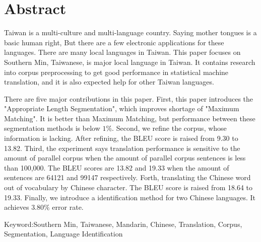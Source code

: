 \chapter{Abstract}
Taiwan is a multi-culture and multi-language country.
Saying mother tongues is a basic human right,
But there are a few electronic applications for these languages.
There are many local languages in Taiwan.
This paper focuses on Southern Min, Taiwanese, is major local language in Taiwan.
It contains research into corpus preprocessing to get good performance in statistical machine translation,
and it is also expected help for other Taiwan languages.%

There are five major contributions in this paper.
First, this paper introduces the "Appropriate Length Segmentation",
which improves shortage of "Maximum Matching".
It is better than Maximum Matching,
but performance between these segmentation methods is below $1\%$.
Second, we refine the corpus,
whose information is lacking.
After refining,
the BLEU score is raised from 9.30 to 13.82.
Third, the experiment says
translation performance is sensitive to the amount of parallel corpus
when the amount of parallel corpus sentences is less than 100,000.
The BLEU scores are 13.82 and 19.33 when the amount of sentences are 64121 and 99147 respectively.
Forth, translating the Chinese word out of vocabulary by Chinese character.
The BLEU score is raised from 18.64 to 19.33.
Finally, we introduce a identification method for two Chinese languages.
It achieves $3.80\%$ error rate.

Keyword:Southern Min, Taiwanese, Mandarin, Chinese, Translation, Corpus, Segmentation, Language Identification